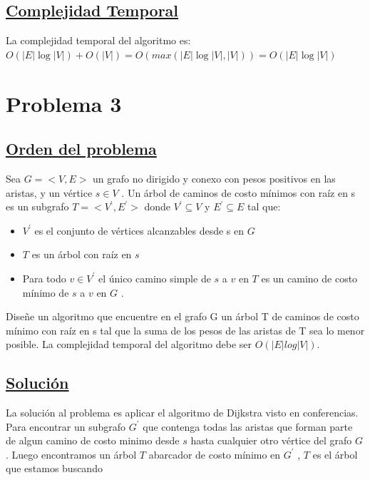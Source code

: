 \documentclass{article}
\begin{document}
    \subsection{\underline{Complejidad Temporal}}
    La complejidad temporal del algoritmo es:\\ $O(|E|\log{|V|}) + O(|V|) = O(max(|E|\log{|V|}, |V|)) = O(|E|\log{|V|})$

    \newpage 


    \section{Problema 3} 

    \subsection{\underline{Orden del problema}} 

    Sea $G = <V,E>$ un grafo no dirigido y conexo con pesos positivos en las aristas, y un v\'ertice $s \in V$ . Un \'arbol de 
    caminos de costo m\'inimos con ra\'iz en s es un subgrafo $T = <V^{'} , E^{'}> $ donde $V^{'} \subseteq  V $     y $E^{'} \subseteq  E $ tal que: 
    
    \begin{itemize}
        \item $V^{'}$ es el conjunto de v\'ertices alcanzables desde s en $G$
        \item $T$ es un \'arbol con ra\'iz en $s$
        \item Para todo $v \in V^{'}$ el \'unico camino simple de $s$ a $v$ en $T$ es un camino de costo m\'inimo de $s$ a $v$ en $G$ .
    \end{itemize}

    \noindent Dise\~ne un algoritmo que encuentre en el grafo G un \'arbol T de caminos de costo m\'inimo con ra\'iz en s tal que
    la suma de los pesos de las aristas de T sea lo menor posible. La complejidad temporal del algoritmo debe ser
    $O(|E|log|V|)$.


    \subsection{\underline{Soluci\'on }}

    \noindent La soluci\'on al problema es aplicar el algoritmo de  Dijkstra visto en conferencias.
    Para encontrar un subgrafo $G^{'}$ que contenga todas las aristas que forman parte de algun camino de 
    costo minimo desde $s$ hasta cualquier otro v\'ertice del grafo $G$. Luego encontramos un \'arbol $T$ abarcador de 
    costo m\'inimo en $G^{'}$ , $T$ es el \'arbol que estamos buscando 
\end{document}
